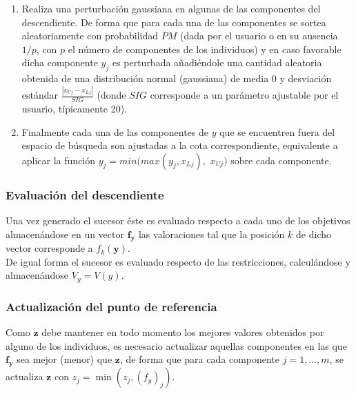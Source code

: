 \begin{enumerate}
        \item Realiza una perturbación gaussiana en algunas de las componentes del descendiente. De forma que para cada una de las componentes se sortea aleatoriamente con probabilidad $PM$ (dada por el usuario o en su ausencia $1/p$, con $p$ el número de componentes de los individuos) y en caso favorable dicha componente $y_j$ es perturbada añadiéndole una cantidad aleatoria obtenida de una distribución normal (gaussiana) de media 0 y desviación estándar $\frac{|x_{Uj} - x_{Lj}|}{SIG}$ (donde $SIG$ corresponde a un parámetro ajustable por el usuario, típicamente 20). \\
        
        \item Finalmente cada una de las componentes de $y$ que se encuentren fuera del espacio de búsqueda son ajustadas a la cota correspondiente, equivalente a aplicar la función $y_j = min(max(y_j ,x_{Lj}),$ $x_{Uj})$ sobre cada componente.\\
        
    \end{enumerate}

\subsubsection{Evaluación del descendiente}

Una vez generado el sucesor éste es evaluado respecto a cada uno de los objetivos almacenándose en un vector $\boldsymbol{f_y}$ las valoraciones tal que la posición $k$ de dicho vector corresponde a $f_k(\boldsymbol{y})$.\\

De igual forma el sucesor es evaluado respecto de las restricciones, calculándose y almacenándose $V_y = V(y)$.\\

\subsubsection{Actualización del punto de referencia}

Como $\boldsymbol{z}$ debe mantener en todo momento los mejores valores obtenidos por alguno de los individuos, es necesario actualizar aquellas componentes en las que $\boldsymbol{f_y}$ sea mejor (menor) que $\boldsymbol{z}$, de forma que para cada componente $j=1, \dots, m$, se actualiza $\boldsymbol{z}$ con $z_j = \min(z_j, (f_y)_j)$.\\

